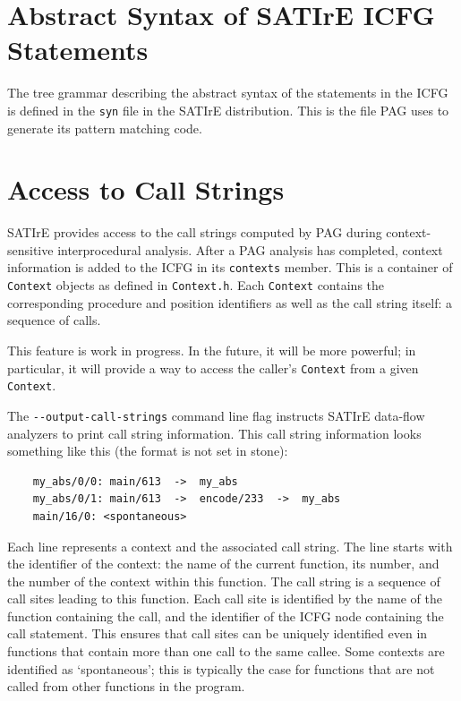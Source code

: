 \documentclass[a4paper,12pt]{report}
\begin{document}
\section{Abstract Syntax of SATIrE ICFG Statements}

The tree grammar describing the abstract syntax of the statements in the
ICFG is defined in the \texttt{syn} file in the SATIrE distribution. This is
the file PAG uses to generate its pattern matching code.

\section{Access to Call Strings}
\label{sec:call_strings}

SATIrE provides access to the call strings computed by PAG during
context-sensitive interprocedural analysis. After a PAG analysis has
completed, context information is added to the ICFG in its \texttt{contexts}
member. This is a container of \texttt{Context} objects as defined in
\verb|Context.h|. Each \texttt{Context} contains the corresponding procedure
and position identifiers as well as the call string itself: a sequence of
calls.

This feature is work in progress. In the future, it will be more powerful;
in particular, it will provide a way to access the caller's \texttt{Context}
from a given \texttt{Context}.

The \verb|--output-call-strings| command line flag instructs SATIrE
data-flow analyzers to print call string information. This call string
information looks something like this (the format is not set in stone):
\begin{verbatim}
    my_abs/0/0: main/613  ->  my_abs
    my_abs/0/1: main/613  ->  encode/233  ->  my_abs
    main/16/0: <spontaneous>
\end{verbatim}

Each line represents a context and the associated call string. The line
starts with the identifier of the context: the name of the current function,
its number, and the number of the context within this function. The call
string is a sequence of call sites leading to this function. Each call site
is identified by the name of the function containing the call, and the
identifier of the ICFG node containing the call statement. This ensures that
call sites can be uniquely identified even in functions that contain more
than one call to the same callee. Some contexts are identified as
`spontaneous'; this is typically the case for functions that are not called
from other functions in the program.
\end{document}
